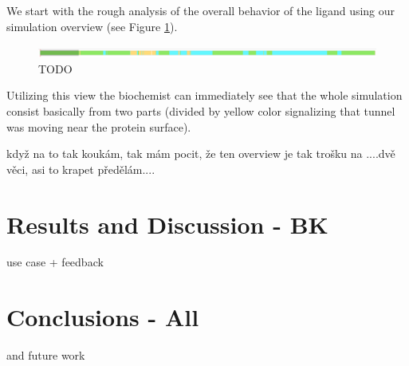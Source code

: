 \documentclass[twocolumn]{bmcart}%
\begin{document}
We start with the rough analysis of the overall behavior of the ligand using our simulation overview (see Figure \ref{fig:case_overview}).

\begin{figure}[htb]
	\centering
  \includegraphics[width=0.95\linewidth]{img/case_overview.png}
  \caption{\label{fig:case_overview} {\color{red}TODO}}
\end{figure}

Utilizing this view the biochemist can immediately see that the whole simulation consist basically from two parts (divided by yellow color signalizing that tunnel was moving near the protein surface).

{\color{red} když na to tak koukám, tak mám pocit, že ten overview je tak trošku na ....dvě věci, asi to krapet předělám....}







\section*{Results and Discussion - BK}
use case + feedback

\section*{Conclusions - All}
and future work 

\end{document}
